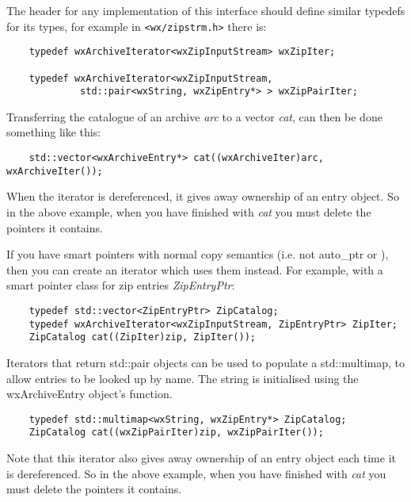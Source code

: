 The header for any implementation of this interface should define similar
typedefs for its types, for example in {\tt <wx/zipstrm.h>} there is:

\begin{verbatim}
    typedef wxArchiveIterator<wxZipInputStream> wxZipIter;

    typedef wxArchiveIterator<wxZipInputStream,
             std::pair<wxString, wxZipEntry*> > wxZipPairIter;

\end{verbatim}

Transferring the catalogue of an archive {\it arc} to a vector {\it cat},
can then be done something like this:

\begin{verbatim}
    std::vector<wxArchiveEntry*> cat((wxArchiveIter)arc, wxArchiveIter());

\end{verbatim}

When the iterator is dereferenced, it gives away ownership of an entry
object. So in the above example, when you have finished with {\it cat}
you must delete the pointers it contains.

If you have smart pointers with normal copy semantics (i.e. not auto\_ptr
or ), then you can create an iterator
which uses them instead.  For example, with a smart pointer class for
zip entries {\it ZipEntryPtr}:

\begin{verbatim}
    typedef std::vector<ZipEntryPtr> ZipCatalog;
    typedef wxArchiveIterator<wxZipInputStream, ZipEntryPtr> ZipIter;
    ZipCatalog cat((ZipIter)zip, ZipIter());

\end{verbatim}

Iterators that return std::pair objects can be used to
populate a std::multimap, to allow entries to be looked
up by name. The string is initialised using the wxArchiveEntry object's
  function.

\begin{verbatim}
    typedef std::multimap<wxString, wxZipEntry*> ZipCatalog;
    ZipCatalog cat((wxZipPairIter)zip, wxZipPairIter());

\end{verbatim}
 
Note that this iterator also gives away ownership of an entry 
object each time it is dereferenced. So in the above example, when
you have finished with {\it cat} you must delete the pointers it contains.

